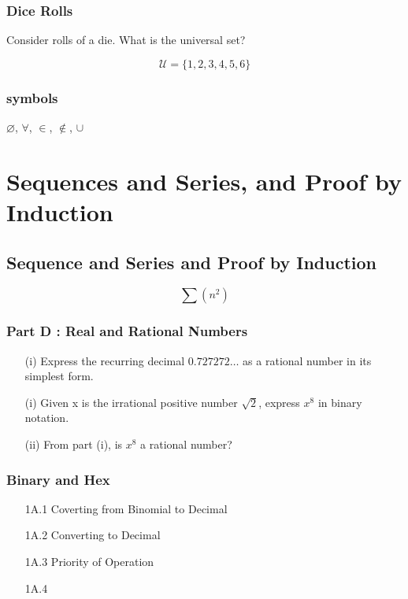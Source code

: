 \documentclass[]{report}
\begin{document}
\subsection*{Dice Rolls}
Consider rolls of a die. What is the universal set?

\[ \mathcal{U} = \{1,2,3,4,5,6\} \]


\subsection*{symbols}
$\varnothing$,
$\forall$,
$\in$,
$\notin$,
$\cup$

\chapter{Sequences and Series, and Proof by Induction}
\section{Sequence and Series and Proof by Induction}


\[\sum (n^2) \]



\subsection*{Part D : Real and Rational Numbers}
\begin{itemize}
\item[(i)] Express the recurring decimal $0.727272\ldots$ as a rational number in its simplest form.
\end{itemize}
\begin{itemize}
\item[(i)] Given x is the irrational positive number $\sqrt{2}$, express $x^8$ in binary notation.
\item[(ii)] From part (i), is $x^8$ a rational number?
\end{itemize}

\subsection*{Binary and Hex}
\begin{itemize}
\item[1A.1] Coverting from Binomial to Decimal
\item[1A.2] Converting to Decimal
\item[1A.3] Priority of Operation
\item[1A.4] 
\end{itemize}
\end{document}

